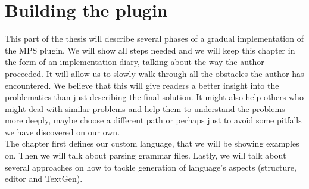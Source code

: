 \chapter{Building the plugin}
\label{chap:importing_the_grammar}

This part of the thesis will describe several phases of a gradual implementation of the MPS plugin.
We will show all steps needed and we will keep this chapter in the form of an implementation diary, talking about the way the author proceeded.
It will allow us to slowly walk through all the obstacles the author has encountered.
We believe that this will give readers a better insight into the problematics than just describing the final solution.
It might also help others who might deal with similar problems and help them to understand the problems more deeply, maybe choose a different path or perhaps just to avoid some pitfalls we have discovered on our own.
\\

The chapter first defines our custom language, that we will be showing examples on.
Then we will talk about parsing grammar files.
Lastly, we will talk about several approaches on how to tackle generation of language's aspects (structure, editor and TextGen).



\pagebreak



\pagebreak



\pagebreak



\pagebreak



\pagebreak

